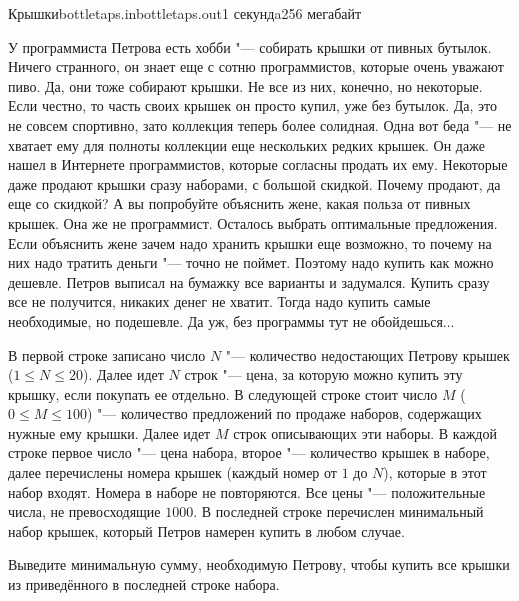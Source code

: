 
\begin{problem}{Крышки}{bottletaps.in}{bottletaps.out}{1 секундa}{256 мегабайт}

У программиста Петрова есть хобби "--- собирать крышки от пивных бутылок.
Ничего странного, он знает еще с сотню программистов, которые очень уважают пиво. Да, они тоже собирают крышки. Не все из них, конечно, но некоторые.
Если честно, то часть своих крышек он просто купил, уже без бутылок. Да, это не совсем спортивно, зато коллекция теперь более солидная.
Одна вот беда "--- не хватает ему для полноты коллекции еще нескольких редких крышек. Он даже нашел в Интернете программистов, которые согласны продать их ему.
Некоторые даже продают крышки сразу наборами, с большой скидкой. Почему продают, да еще со скидкой? А вы попробуйте объяснить жене, какая польза от пивных крышек. 
Она же не программист. Осталось выбрать оптимальные предложения. Если объяснить жене зачем надо хранить крышки еще возможно,
то почему на них надо тратить деньги "--- точно не поймет. Поэтому надо купить как можно дешевле.
Петров выписал на бумажку все варианты и задумался. Купить сразу все не получится, никаких денег не хватит.
Тогда надо купить самые необходимые, но подешевле. Да уж, без программы тут не обойдешься...

\InputFile

В первой строке записано число $N$ "--- количество недостающих Петрову крышек ($1 \le N \le 20$).
Далее идет $N$ строк "--- цена, за которую можно купить эту крышку, если покупать ее отдельно.
В следующей строке стоит число $M$ ($0 \le M \le 100$) "--- количество предложений по продаже наборов, содержащих нужные ему крышки.
Далее идет $M$ строк описывающих эти наборы.
В каждой строке первое число "--- цена набора, второе "--- количество крышек в наборе, далее перечислены номера крышек (каждый номер от $1$ до $N$),
которые в этот набор входят. Номера в наборе не повторяются. Все цены "--- положительные числа, не превосходящие $1000$.
В последней строке перечислен минимальный набор крышек, который Петров намерен купить в любом случае.

\OutputFile

Выведите минимальную сумму, необходимую Петрову, чтобы купить все крышки из приведённого в последней строке набора.

\Examples

\begin{example}
%
\end{example}

\end{problem}
